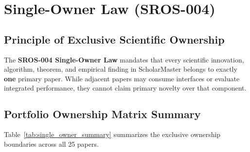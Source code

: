 \documentclass[11pt,letterpaper]{article}
\begin{document}
\section{Single-Owner Law (SROS-004)}

\subsection{Principle of Exclusive Scientific Ownership}
The \textbf{SROS-004 Single-Owner Law} mandates that every scientific innovation, algorithm, theorem, and empirical finding in ScholarMaster belongs to exactly \textbf{one} primary paper. While adjacent papers may consume interfaces or evaluate integrated performance, they cannot claim primary novelty over that component.

\subsection{Portfolio Ownership Matrix Summary}
Table~\ref{tab:single_owner_summary} summarizes the exclusive ownership boundaries across all 25 papers.
\end{document}
